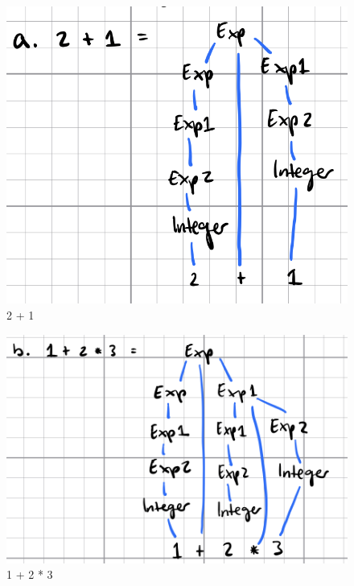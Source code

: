 \documentclass{article}
\theoremstyle{theorem}
\theoremstyle{definition}
\theoremstyle{remark}
\begin{document}
\begin{figure}[H]
\begin{center}
\includegraphics[scale=0.4]{img/C1.png}
\end{center}
\caption{2 + 1}\label{C1}
\end{figure}

\begin{figure}[H]
\begin{center}
\includegraphics[scale=0.4]{img/C2.png}
\end{center}
\caption{1 + 2 * 3}\label{C2}
\end{figure}
\end{document}
